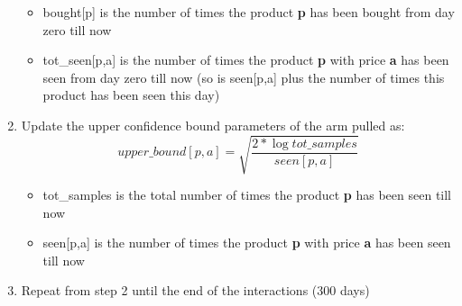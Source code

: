 \begin{enumerate}
\begin{itemize}
            \item bought[p] is the number of times the product {\bf p} has been bought from day zero till now
            \item tot\_seen[p,a] is the number of times the product {\bf p} with price {\bf a} has been seen from day zero till now (so is seen[p,a] plus the number of times this product has been seen this day)
        \end{itemize}
    \item Update the upper confidence bound parameters of the arm pulled as:
        \begin{equation}
            upper\_bound[p,a] = \sqrt{\frac{2 * \log tot\_samples}{seen[p,a]}}
        \end{equation}
        \begin{itemize}
            \item tot\_samples is the total number of times the product {\bf p} has been seen till now
            \item seen[p,a] is the number of times the product {\bf p} with price {\bf a} has been seen  till now
        \end{itemize}
    \item Repeat from step 2 until the end of the interactions (300 days)
\end{enumerate}
